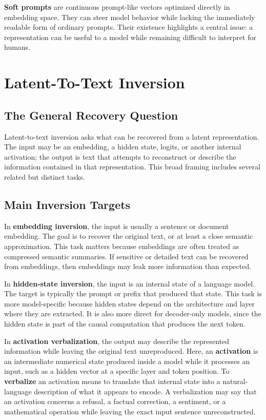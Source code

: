 \documentclass[12pt,a4paper,twoside,openright]{book}
\begin{document}
\textbf{Soft prompts} are continuous prompt-like vectors optimized directly in
embedding space. They can steer model behavior while lacking the immediately
readable form of ordinary prompts. Their existence highlights a central issue:
a representation can be useful to a model while remaining difficult to
interpret for humans.

\section{Latent-To-Text Inversion}

\subsection{The General Recovery Question}

Latent-to-text inversion asks what can be recovered from a latent
representation. The input may be an embedding, a hidden state, logits, or another
internal activation; the output is text that attempts to reconstruct or describe
the information contained in that representation. This broad framing includes
several related but distinct tasks.

\subsection{Main Inversion Targets}

In \textbf{embedding inversion}, the input is usually a sentence or document
embedding. The goal is to recover the original text, or at least a close
semantic approximation. This task matters because embeddings are often treated
as compressed semantic summaries. If sensitive or detailed text can be recovered
from embeddings, then embeddings may leak more information than expected.

In \textbf{hidden-state inversion}, the input is an internal state of a language
model. The target is typically the prompt or prefix that produced that state.
This task is more model-specific because hidden states depend on the architecture
and layer where they are extracted. It is also more direct for decoder-only
models, since the hidden state is part of the causal computation that produces
the next token.

In \textbf{activation verbalization}, the output may describe the represented
information while leaving the original text unreproduced. Here, an
\textbf{activation} is an intermediate numerical state produced inside a model
while it processes an input, such as a hidden vector at a specific layer and
token position. To \textbf{verbalize} an activation means to translate that
internal state into a natural-language description of what it appears to encode.
A verbalization may say that an activation concerns a refusal, a factual
correction, a sentiment, or a mathematical operation while leaving the exact
input sentence unreconstructed.
\end{document}
